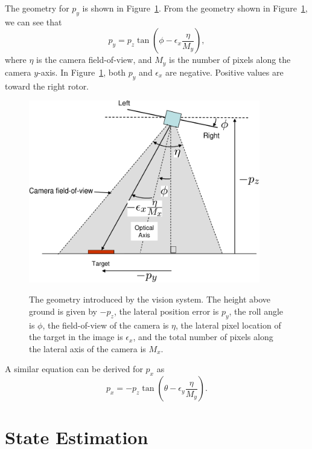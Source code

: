 {The geometry for $p_y$ is shown in Figure~\ref{fig:vision_lateral}.
From the geometry shown in Figure~\ref{fig:vision_lateral}, we can
see that
\begin{equation} \label{eq:camera_py}
p_y = p_z \tan\left( \phi - \epsilon_x\frac{\eta}{M_y} \right),
\end{equation}
where $\eta$ is the camera field-of-view, and $M_y$ is the number of
pixels along the camera $y$-axis.  In
Figure~\ref{fig:vision_lateral}, both $p_y$ and $\epsilon_x$ are
negative.  Positive values are toward the right rotor.
\begin{figure}[hhhhtb]
  \centering
  \includegraphics[width=0.9\textwidth]{chap11_attitude_estimation/figures/vision_lateral}\\
  \caption{The geometry introduced by the vision system.  The height
  above ground is given by $-p_z$, the lateral position error is
  $p_y$, the roll angle is $\phi$, the field-of-view of the
  camera is $\eta$, the lateral pixel location of the target in the image is
  $\epsilon_x$, and the total number of pixels along the lateral
  axis of the camera is $M_x$.
  }%
  \label{fig:vision_lateral}
\end{figure}
A similar equation can be derived for $p_x$ as
\begin{equation} \label{eq:camera_px}
p_x = -p_z \tan\left( \theta - \epsilon_y\frac{\eta}{M_y} \right).
\end{equation}


\section{State Estimation}

}
